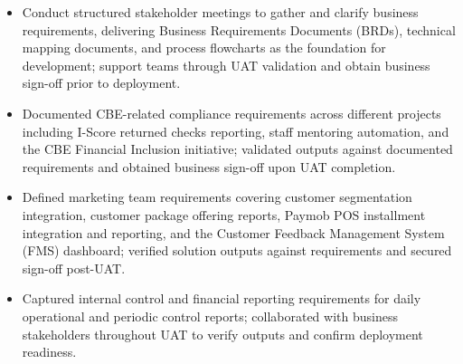 

\begin{itemize}
    \item Conduct structured stakeholder meetings to gather and clarify business requirements, delivering Business Requirements Documents (BRDs), technical mapping documents, and process flowcharts as the foundation for development; support teams through UAT validation and obtain business sign-off prior to deployment.
    \item Documented CBE-related compliance requirements across different projects including I-Score returned checks reporting, staff mentoring automation, and the CBE Financial Inclusion initiative; validated outputs against documented requirements and obtained business sign-off upon UAT completion.
    \item Defined marketing team requirements covering customer segmentation integration, customer package offering reports, Paymob POS installment integration and reporting, and the Customer Feedback Management System (FMS) dashboard; verified solution outputs against requirements and secured sign-off post-UAT.
    \item Captured internal control and financial reporting requirements for daily operational and periodic control reports; collaborated with business stakeholders throughout UAT to verify outputs and confirm deployment readiness.
\end{itemize}
